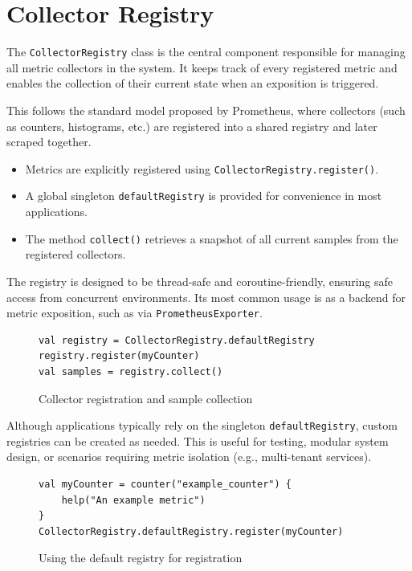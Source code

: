 \section{Collector Registry}\label{sec:collector-registry}

The \texttt{CollectorRegistry} class is the central component responsible for managing all metric collectors in the system.
It keeps track of every registered metric and enables the collection of their current state when an exposition is triggered.

This follows the standard model proposed by Prometheus, where collectors (such as counters, histograms, etc.) are registered into a shared registry and later scraped together.

\begin{itemize}
    \item Metrics are explicitly registered using \texttt{CollectorRegistry.register()}.
    \item A global singleton \texttt{defaultRegistry} is provided for convenience in most applications.
    \item The method \texttt{collect()} retrieves a snapshot of all current samples from the registered collectors.
\end{itemize}

The registry is designed to be thread-safe and coroutine-friendly, ensuring safe access from concurrent environments.
Its most common usage is as a backend for metric exposition, such as via \texttt{PrometheusExporter}.

\begin{figure}[h]
    \begin{lstlisting}
val registry = CollectorRegistry.defaultRegistry
registry.register(myCounter)
val samples = registry.collect()
    \end{lstlisting}
    \caption{Collector registration and sample collection}
\end{figure}

Although applications typically rely on the singleton \texttt{defaultRegistry}, custom registries can be created as needed. This is useful for testing, modular system design, or scenarios requiring metric isolation (e.g., multi-tenant services).

\begin{figure}[h]
    \begin{lstlisting}
val myCounter = counter("example_counter") {
    help("An example metric")
}
CollectorRegistry.defaultRegistry.register(myCounter)
    \end{lstlisting}
    \caption{Using the default registry for registration}
\end{figure}


